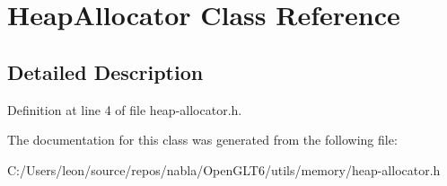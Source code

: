 \hypertarget{class_heap_allocator}{}\section{Heap\+Allocator Class Reference}
\label{class_heap_allocator}


\subsection{Detailed Description}


Definition at line 4 of file heap-\/allocator.\+h.



The documentation for this class was generated from the following file\+:\begin{DoxyCompactItemize}
\item 
C\+:/\+Users/leon/source/repos/nabla/\+Open\+G\+L\+T6/utils/memory/heap-\/allocator.\+h\end{DoxyCompactItemize}

